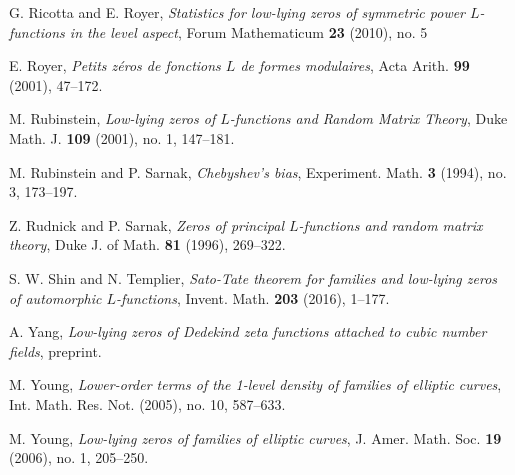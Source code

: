 \documentclass[12pt, reqno]{amsart}
\numberwithin{equation}{section}
\theoremstyle{definition}
\theoremstyle{remark}
\begin{document}
\begin{thebibliography}{FMGGGG15}
\newblock G. Ricotta and E. Royer, \emph{Statistics for low-lying
zeros of symmetric power $L$-functions in the level aspect}, Forum Mathematicum \textbf{23} (2010), no. 5

\newblock E. Royer, \emph{Petits z\'{e}ros de fonctions $L$
de formes modulaires}, Acta Arith. \textbf{99} (2001), 47--172.

\newblock M. Rubinstein, \emph{Low-lying zeros of
$L$-functions and Random Matrix Theory}, Duke Math. J. \textbf{109}
(2001), no. 1, 147--181.

M. Rubinstein and P. Sarnak, \emph{Chebyshev's bias}, Experiment.
Math. \textbf{3} (1994), no. 3, 173--197.

Z. Rudnick and P. Sarnak, \emph{Zeros of principal $L$-functions and random matrix theory}, Duke J. of Math. \textbf{81} (1996),
269--322.

S. W. Shin and N. Templier, \emph{Sato-Tate theorem for families and low-lying zeros of automorphic $L$-functions}, Invent. Math. \textbf{203} (2016), 1--177.

A. Yang, \emph{Low-lying zeros of Dedekind zeta functions attached to cubic number fields}, preprint.

\newblock M. Young, \emph{Lower-order terms of the 1-level density of families of elliptic
curves},  Int. Math. Res. Not. (2005),  no. 10, 587--633.

\newblock M. Young, \emph{Low-lying zeros of families of elliptic curves},
J. Amer. Math. Soc. \textbf{19} (2006), no. 1, 205--250.

\end{thebibliography}
\end{document}

